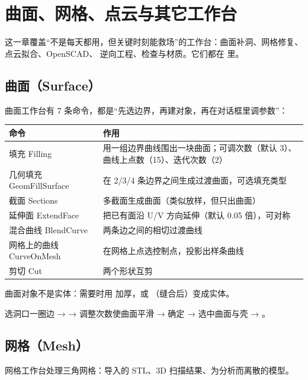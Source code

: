 \chapter{曲面、网格、点云与其它工作台}

这一章覆盖“不是每天都用，但关键时刻能救场”的工作台：曲面补洞、网格修复、点云拟合、OpenSCAD、
逆向工程、检查与材质。它们都在  里。

\section{曲面（Surface）}

曲面工作台有 7 条命令，都是“先选边界，再建对象，再在对话框里调参数”：

\begin{center}
\small
\begin{tabularx}{\linewidth}{@{}lX@{}}
\toprule
\textbf{命令} & \textbf{作用} \\
\midrule
填充 Filling & 用一组边界曲线围出一块曲面；可调次数（默认 3）、曲线上点数（15）、迭代次数（2）\\
几何填充 GeomFillSurface & 在 2/3/4 条边界之间生成过渡曲面，可选填充类型 \\
截面 Sections & 多截面生成曲面（类似放样，但只出曲面）\\
延伸面 ExtendFace & 把已有面沿 U/V 方向延伸（默认 0.05 倍），可对称 \\
混合曲线 BlendCurve & 两条边之间的相切过渡曲线 \\
网格上的曲线 CurveOnMesh & 在网格上点选控制点，投影出样条曲线 \\
剪切 Cut & 两个形状互剪 \\
\bottomrule
\end{tabularx}
\end{center}

曲面对象不是实体：需要时用  加厚，或 （缝合后）变成实体。

\begin{practice}[练习：给破洞的壳补面]
选洞口一圈边 →  → 调整次数使曲面平滑 → 确定 → 选中曲面与壳 → 。
\end{practice}

\section{网格（Mesh）}

网格工作台处理三角网格：导入的 STL、3D 扫描结果、为分析而离散的模型。

